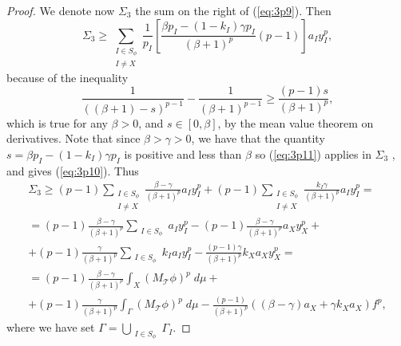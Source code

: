 \documentclass[10pt,a4paper]{amsart}
\newcommand{\mc}[1]{\mathcal{#1}}
\begin{document}
\begin{proof}
We denote now $\Sigma_3$ the sum on the right of (\ref{eq:3p9}).
Then
\begin{equation}\label{eq:3p10}
\Sigma_3 \geq \sum_{\substack{I\in S_\phi \\ I\neq X}} \frac{1}{p_I}\left[ \frac{\beta p_I-(1-k_I)\gamma p_I}{(\beta +1)^p} (p-1) \right]a_I y_I^p,
\end{equation}
because of the inequality
\begin{equation}\label{eq:3p11}
\frac{1}{\left( (\beta +1)-s \right)^{p-1}}-\frac{1}{(\beta +1)^{p-1}}\geq\frac{(p-1)s}{(\beta +1)^p},
\end{equation}
which is true for any $\beta>0$, and $s\in[0,\beta]$, by the mean value theorem on derivatives. Note that since $\beta>\gamma>0$, we have that the quantity $s=\beta p_I-(1-k_I)\gamma p_I$ is positive and less than $\beta$ so (\ref{eq:3p11}) applies in $\Sigma_3$ , and gives (\ref{eq:3p10}). Thus
\begin{multline} \label{eq:3p12}
\Sigma_3\geq (p-1)\sum_{\substack{I\in S_\phi \\ I\neq X}} \frac{\beta -\gamma}{(\beta +1)^{p}}a_I y_I^p+ (p-1)\sum_{\substack{I\in S_\phi \\ I\neq X}}\frac{k_I \gamma}{(\beta+1)^p}a_I y_I^p=\\
=(p-1)\frac{\beta-\gamma}{(\beta +1)^p}\sum_{\substack{I\in S_\phi }}a_I y_I^p -(p-1)\frac{\beta- \gamma}{(\beta +1)^p}a_Xy_X^p+\\
+ (p-1)\frac{\gamma}{(\beta +1)^p}\sum_{\substack{I\in S_\phi }}k_I a_I y_I^p-\frac{(p-1)\gamma}{(\beta +1)^p} k_Xa_X y_X^p=\\
=(p-1)\frac{\beta-\gamma}{(\beta +1)^p}\int_X \left(M_{\mc T}\phi \right)^p\; d\mu +\\
+ (p-1)\frac{\gamma}{(\beta +1)^p}\int_{\Gamma} \left(M_{\mc T}\phi \right)^p\; d\mu-\frac{(p-1)}{(\beta +1)^p} \left( (\beta-\gamma)a_X+\gamma k_X a_X \right) f^p,
\end{multline}
where we have set $\Gamma=\bigcup_{\substack{I\in S_\phi}} \Gamma_I$.


\end{proof}
\end{document}
